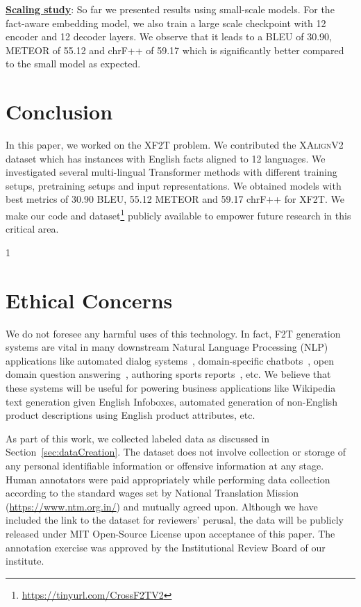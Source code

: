 \documentclass[runningheads]{llncs}
\newcommand{\data}{\textsc{XAlignV2}}
\def\arxiv{1}
\begin{document}
\noindent\underline{\textbf{Scaling study}}: So far we presented results using small-scale models. For the fact-aware embedding model, we also train a large scale checkpoint with 12 encoder and 12 decoder layers. We observe that it leads to a BLEU of 30.90, METEOR of 55.12 and chrF++ of 59.17 which is significantly better compared to the small model as expected.










\section{Conclusion}
\label{sec:conclusion}
In this paper, we worked on the XF2T problem. We contributed the \data{} dataset which has instances with English facts aligned to 12 languages. We investigated several multi-lingual Transformer methods with different training setups, pretraining setups and input representations. We obtained models with best metrics of 30.90 BLEU, 55.12 METEOR and 59.17 chrF++ for XF2T. We make our code and dataset\footnote{\url{https://tinyurl.com/CrossF2TV2}} publicly available to empower future research in this critical area.

\if\arxiv1
\section{Ethical Concerns}
\label{sec:ethical}
We do not foresee any harmful uses of this technology. In fact, F2T generation systems are vital in many downstream Natural Language Processing (NLP) applications like automated dialog systems~\cite{wen2016multi}, domain-specific chatbots~\cite{novikova2017e2e}, open domain question answering~\cite{chen2020kgpt}, authoring sports reports~\cite{chen2008learning}, etc. We believe that these systems will be useful for powering business applications like Wikipedia text generation given English Infoboxes, automated generation of non-English product descriptions using English product attributes, etc.

As part of this work, we collected labeled data as discussed in Section~\ref{sec:dataCreation}. The dataset does not involve collection or storage of any personal identifiable information or offensive information at any stage. Human annotators were paid appropriately while performing data collection according to the standard wages set by National Translation Mission (\url{https://www.ntm.org.in/}) and mutually agreed upon. Although we have included the link to the dataset for reviewers' perusal, the data will be publicly released under MIT Open-Source License upon acceptance of this paper. The annotation exercise was approved by the Institutional Review Board of our institute.
\fi
\end{document}
